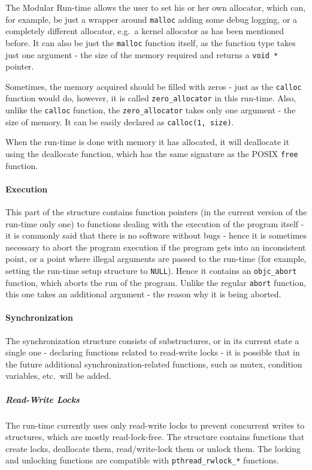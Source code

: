 The Modular Run-time allows the user to set his or her own allocator, which can, for example, be just a wrapper around \verb=malloc= adding some debug logging, or a completely different allocator, e.g.\ a kernel allocator as has been mentioned before. It can also be just the \verb=malloc= function itself, as the function type takes just one argument - the size of the memory required and returns a \verb=void *= pointer.

Sometimes, the memory acquired should be filled with zeros - just as the \verb=calloc= function would do, however, it is called \verb=zero_allocator= in this run-time. Also, unlike the \verb=calloc= function, the \verb=zero_allocator= takes only one argument - the size of memory. It can be easily declared as \verb=calloc(1, size)=.

When the run-time is done with memory it has allocated, it will deallocate it using the deallocate function, which has the same signature as the POSIX \verb=free= function.

\paragraph{Execution}

This part of the structure contains function pointers (in the current version of the run-time only one) to functions dealing with the execution of the program itself - it is commonly said that there is no software without bugs - hence it is sometimes necessary to abort the program execution if the program gets into an inconsistent point, or a point where illegal arguments are passed to the run-time (for example, setting the run-time setup structure to \verb=NULL=). Hence it contains an \verb=objc_abort= function, which aborts the run of the program. Unlike the regular \verb=abort= function, this one takes an additional argument - the reason why it is being aborted.

\paragraph{Synchronization}

The synchronization structure consists of substructures, or in its current state a single one - declaring functions related to read-write locks - it is possible that in the future additional synchronization-related functions, such as mutex, condition variables, etc.\ will be added.

\subparagraph{Read-Write Locks} The run-time currently uses only read-write locks to prevent concurrent writes to structures, which are mostly read-lock-free. The structure contains functions that create locks, deallocate them, read/write-lock them or unlock them. The locking and unlocking functions are compatible with \newline{}\verb=pthread_rwlock_*= functions.


